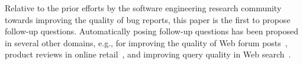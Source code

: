 Relative to the prior efforts by the software engineering research community towards improving the quality of bug reports, this paper is the first to propose follow-up questions. Automatically posing follow-up questions has been proposed in several other domains, e.g.,  for improving the quality of Web forum posts~\cite{rao-daume-iii-2018-learning}, product reviews in online retail~\cite{rao2019answer}, and improving query quality in Web search~\cite{10.1145/3366423.3380126}.

%
